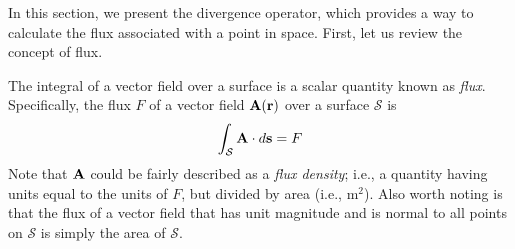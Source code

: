 

\label{m0044_Divergence} %

In this section, we present the divergence operator, which provides a way to calculate the flux associated with a point in space.
First, let us review the concept of flux.

The integral of a vector field over a surface is a scalar quantity known as \emph{flux}.  
Specifically, the flux $F$ of a vector field ${\bf A}({\bf r})$ over a surface ${\mathcal S}$ is
%
\begin{equation}
\int_{\mathcal S}{\bf A}\cdot d{\bf s} = F
\end{equation}
%
Note that ${\bf A}$ could be fairly described as a \emph{flux density}; i.e., a quantity having units equal to the units of $F$, but divided by area (i.e., m$^2$).
Also worth noting is that the flux of a vector field that has unit magnitude and is normal to all points on ${\mathcal S}$ is simply the area of ${\mathcal S}$. 

